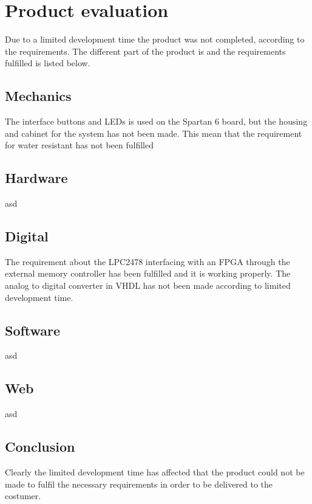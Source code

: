 \section{Product evaluation}
Due to a limited development time the product was not completed, according to the requirements. The different part of the product is and the requirements fulfilled is listed below.
\subsection{Mechanics}
The interface buttons and LEDs is used on the Spartan 6 board, but the housing and cabinet for the system has not been made. This mean that the requirement for water resistant has not been fulfilled
\subsection{Hardware}
asd
\subsection{Digital}
The requirement about the LPC2478 interfacing with an FPGA through the external memory controller has been fulfilled and it is working properly. The analog to digital converter in VHDL has not been made according to limited development time.
\subsection{Software}
asd
\subsection{Web}
asd
\subsection{Conclusion}
Clearly the limited development time has affected that the product could not be made to fulfil the necessary requirements in order to be delivered to the costumer.